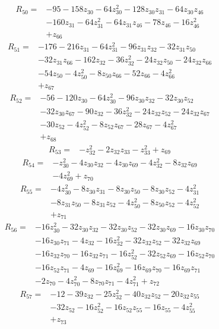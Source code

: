 \begin{align*}
R_{50}={}&-95-158z_{30}-64z_{30}^{2}-128z_{30}z_{31}-64z_{30}z_{46}\\
&-160z_{31}-64z_{31}^{2}-64z_{31}z_{46}-78z_{46}-16z_{46}^{2}\\
&+z_{66}
\end{align*}
\begin{align*}
R_{51}={}&-176-216z_{31}-64z_{31}^{2}-96z_{31}z_{32}-32z_{31}z_{50}\\
&-32z_{31}z_{66}-162z_{32}-36z_{32}^{2}-24z_{32}z_{50}-24z_{32}z_{66}\\
&-54z_{50}-4z_{50}^{2}-8z_{50}z_{66}-52z_{66}-4z_{66}^{2}\\
&+z_{67}
\end{align*}
\begin{align*}
R_{52}={}&-56-120z_{30}-64z_{30}^{2}-96z_{30}z_{32}-32z_{30}z_{52}\\
&-32z_{30}z_{67}-90z_{32}-36z_{32}^{2}-24z_{32}z_{52}-24z_{32}z_{67}\\
&-30z_{52}-4z_{52}^{2}-8z_{52}z_{67}-28z_{67}-4z_{67}^{2}\\
&+z_{68}
\end{align*}
\begin{align*}
R_{53}={}&-z_{32}^{2}-2z_{32}z_{33}-z_{33}^{2}+z_{69}
\end{align*}
\begin{align*}
R_{54}={}&-z_{30}^{2}-4z_{30}z_{32}-4z_{30}z_{69}-4z_{32}^{2}-8z_{32}z_{69}\\
&-4z_{69}^{2}+z_{70}
\end{align*}
\begin{align*}
R_{55}={}&-4z_{30}^{2}-8z_{30}z_{31}-8z_{30}z_{50}-8z_{30}z_{52}-4z_{31}^{2}\\
&-8z_{31}z_{50}-8z_{31}z_{52}-4z_{50}^{2}-8z_{50}z_{52}-4z_{52}^{2}\\
&+z_{71}
\end{align*}
\begin{align*}
R_{56}={}&-16z_{30}^{2}-32z_{30}z_{32}-32z_{30}z_{52}-32z_{30}z_{69}-16z_{30}z_{70}\\
&-16z_{30}z_{71}-4z_{32}-16z_{32}^{2}-32z_{32}z_{52}-32z_{32}z_{69}\\
&-16z_{32}z_{70}-16z_{32}z_{71}-16z_{52}^{2}-32z_{52}z_{69}-16z_{52}z_{70}\\
&-16z_{52}z_{71}-4z_{69}-16z_{69}^{2}-16z_{69}z_{70}-16z_{69}z_{71}\\
&-2z_{70}-4z_{70}^{2}-8z_{70}z_{71}-4z_{71}^{2}+z_{72}
\end{align*}
\begin{align*}
R_{57}={}&-12-39z_{32}-25z_{32}^{2}-40z_{32}z_{52}-20z_{32}z_{55}\\
&-32z_{52}-16z_{52}^{2}-16z_{52}z_{55}-16z_{55}-4z_{55}^{2}\\
&+z_{73}
\end{align*}
